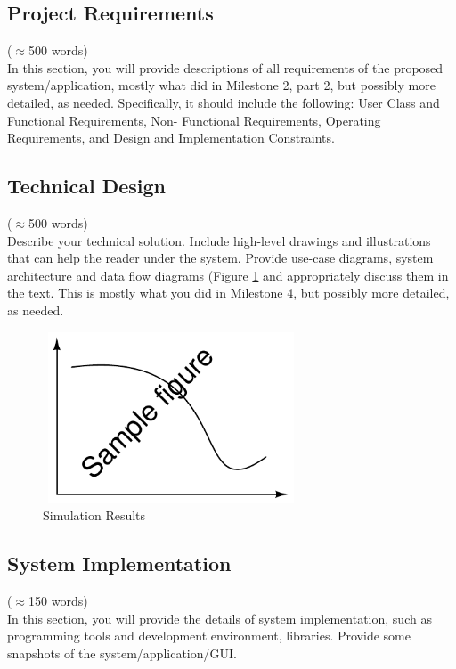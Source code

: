 \documentclass[12pt]{article}
\begin{document}
\subsection{Project Requirements}\label{sec:requirements}
($\approx$500 words)\\
In this section, you will provide descriptions of all requirements of the proposed system/application, mostly what did in Milestone 2, part 2, but possibly more detailed, as needed. Specifically, it should include the following: User Class and Functional Requirements, Non- Functional Requirements, Operating Requirements, and Design and Implementation Constraints.

\subsection{Technical Design}\label{sec:design}
($\approx$500 words)\\
Describe your technical solution. Include high-level drawings and illustrations that can help
the reader under the system. Provide use-case diagrams, system architecture and data flow diagrams (Figure \ref{fig:simulationfigure} and appropriately discuss them in the text. This is mostly what you did in Milestone 4, but possibly more detailed, as needed.

\begin{figure}[h]
    \centering
    \includegraphics[height = 2.0in, width=3.0in]{myfigure}
    \caption{Simulation Results}
    \label{fig:simulationfigure}
\end{figure}

\subsection{System Implementation}\label{chap:implementation}
($\approx$150 words)\\
In this section, you will provide the details of system implementation, such as programming tools and development environment, libraries. Provide some snapshots of the system/application/GUI.
\end{document}
